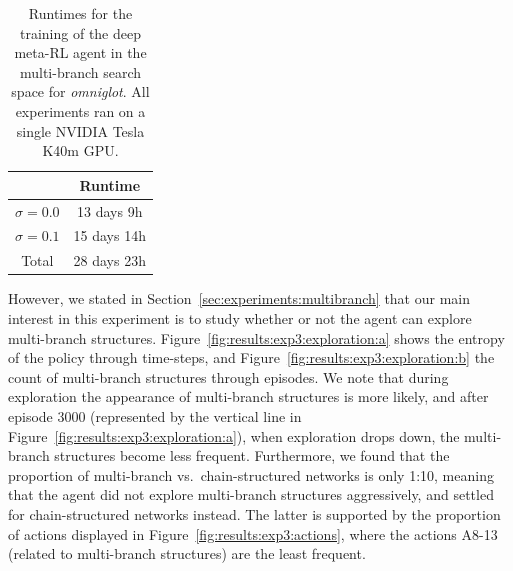 \begin{table}[ht]
\centering
\begin{tabular}{@{}cc@{}}
\toprule
                  & Runtime \\ \midrule
$\sigma = 0.0$ & 13 days 9h   \\
$\sigma = 0.1$ & 15 days 14h  \\ \midrule
Total                    & 28 days 23h  \\ \bottomrule
\end{tabular}
\caption{Runtimes for the training of the deep meta-RL agent in the multi-branch search space for \textit{omniglot}. All experiments ran on a single NVIDIA Tesla K40m GPU.}
\label{tab:results:exp3:times}
\end{table}


However, we stated in Section~\ref{sec:experiments:multibranch} that our main interest in this experiment is to study whether or not the agent can explore multi-branch structures. Figure~\ref{fig:results:exp3:exploration:a} shows the entropy of the policy through time-steps, and Figure~\ref{fig:results:exp3:exploration:b} the count of multi-branch structures through episodes. We note that during exploration the appearance of multi-branch structures is more likely, and after episode 3000 (represented by the vertical line in Figure~\ref{fig:results:exp3:exploration:a}), when exploration drops down, the multi-branch structures become less frequent. Furthermore, we found that the proportion of multi-branch vs.~chain-structured networks is only 1:10, meaning that the agent did not explore multi-branch structures aggressively, and settled for chain-structured networks instead. The latter is supported by the proportion of actions displayed in Figure~\ref{fig:results:exp3:actions}, where the actions \textsc{A8-13} (related to multi-branch structures) are the least frequent.



